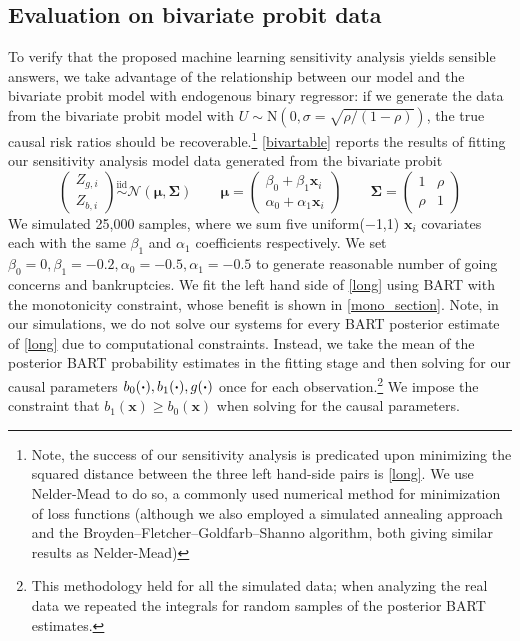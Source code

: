 \documentclass[aoas,preprint, 11pt, dvipsnames, table, x11name]{imsart}
\renewcommand{\bm}[1]{\mathbf{#1}}
\theoremstyle{remark}
\begin{document}
	\subsection{Evaluation on bivariate probit data}\label{bivar_simsec} To verify that the proposed machine learning sensitivity analysis yields sensible answers, we take advantage of the relationship between our model and the bivariate probit model with endogenous binary regressor: if we generate the data from the bivariate probit model with $U \sim \mbox{N}(0, \sigma=\sqrt{\rho/(1-\rho)})$, the true causal risk ratios should be recoverable.\footnote{Note, the success of our sensitivity analysis is predicated upon  minimizing the squared distance between the three left hand-side pairs is \autoref{long}. We use Nelder-Mead to do so, a commonly used numerical method for minimization of loss functions \citep{nelder} (although we also employed a simulated annealing approach and the Broyden–Fletcher–Goldfarb–Shanno algorithm, both giving similar results as Nelder-Mead)}  \autoref{bivartable} reports the results of fitting our sensitivity analysis model data generated from the bivariate probit
	\[
	\begin{pmatrix}
		Z_{g,i}\\
		Z_{b,i}
	\end{pmatrix}\stackrel{\text{iid}}{\sim}\mathcal{N}(\bm{\mu}, \bm{\Sigma})
	\qquad \bm{\mu}=\begin{pmatrix}
		\beta_0+\beta_1\bm{x}_i\\
		\alpha_0+\alpha_1\bm{x}_i
	\end{pmatrix}
	\qquad
	\bm{\Sigma}=\begin{pmatrix}
		1&\rho\\
		\rho&1
	\end{pmatrix}
	\label{model3}
	\]
	We simulated 25,000 samples, where we sum five uniform($-$1,1) $\bm{x}_i$ covariates each with the same $\beta_1$ and $\alpha_1$ coefficients respectively.  We set $\beta_0=0, \beta_1=-0.2, \alpha_0=-0.5, \alpha_1=-0.5$ to generate reasonable number of going concerns and bankruptcies.  We fit the left hand side of \autoref{long} using BART with the monotonicity constraint, whose benefit is shown in \autoref{mono_section}.  Note, in our simulations, we do not solve our systems for every BART posterior estimate of \autoref{long} due to computational constraints.  Instead, we take the mean of the posterior BART probability estimates in the fitting stage and then solving for our causal parameters $b_0(\vdot), b_1(\vdot), g(\vdot)$ once for each observation.\footnote{This methodology held for all the simulated data; when analyzing the real data we repeated the integrals for random samples of the posterior BART estimates.} We impose the constraint that $b_1(\bm{x})\geq b_0(\bm{x})$ when solving for the causal parameters.
	
\end{document}
